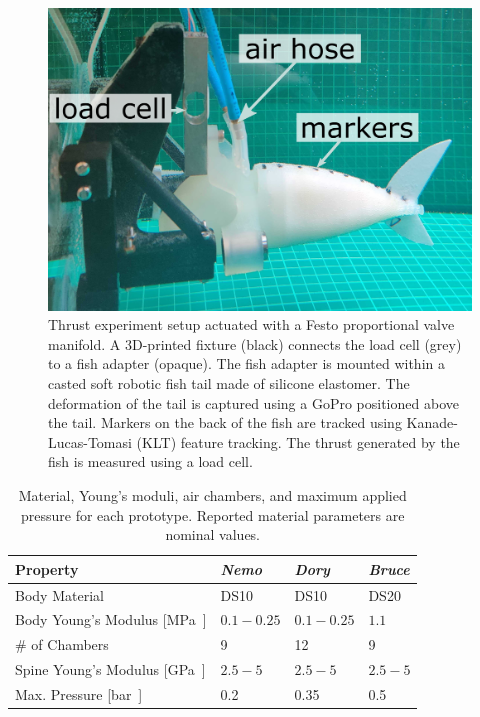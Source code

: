 \begin{figure}[tb]
    \centering
    \includegraphics[width=0.65\columnwidth]{figures/experimental_setup_v2.png}
    \caption{Thrust experiment setup actuated with a Festo proportional valve manifold. A 3D-printed fixture (black) connects the load cell (grey) to a fish adapter (opaque). The fish adapter is mounted within a casted soft robotic fish tail made of silicone elastomer. The deformation of the tail is captured using a GoPro positioned above the tail. Markers on the back of the fish are tracked using Kanade-Lucas-Tomasi (KLT) feature tracking. The thrust generated by the fish is measured using a load cell.}
    \label{fig:experimental_setup}
\end{figure}
\begin{table}[t]
    \centering
    \caption{Material, Young's moduli, air chambers, and maximum applied pressure for each prototype. Reported material parameters are nominal values.}
    \begin{tabular}{@{}llll@{}}
    \toprule
    Property & \emph{Nemo} & \emph{Dory} & \emph{Bruce}\\ 
    \midrule
    Body Material & DS10 & DS10 & DS20 \\ 
    Body Young's Modulus [\si\MPa] & $0.1-0.25$ & $0.1-0.25$ & $1.1$ \\
    \# of Chambers & 9 & 12 & 9 \\
    Spine Young's Modulus [\si\GPa] & $2.5-5$ & $2.5-5$ & $2.5-5$ \\
    Max. Pressure [\si\bar] & 0.2 & 0.35 & 0.5 \\
    \bottomrule
    \end{tabular}
    \label{tab:fish}
\end{table}
